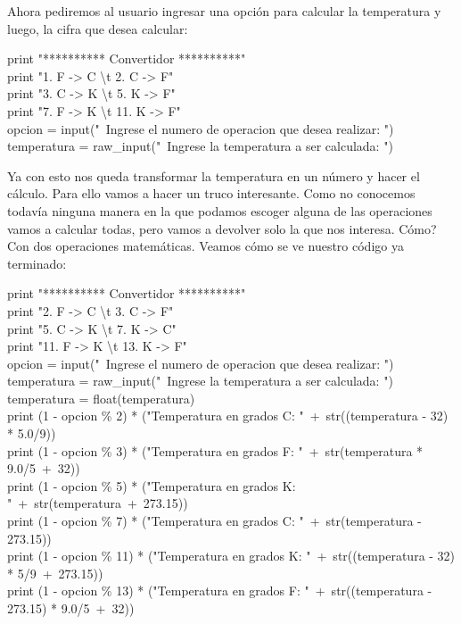 \documentclass[10pt,letterpaper]{article}
\newenvironment{Code}
{
\begin{lrbox}{\selvestebox}%
\begin{minipage}{\dimexpr\columnwidth-2\fboxsep\relax}
\fontfamily{\ttdefault}\selectfont
}
{\end{minipage}\end{lrbox}%
\begin{center}
\colorbox{light-gray}{\usebox{\selvestebox}}
\end{center}
}
\begin{document}
\noindent Ahora pediremos al usuario ingresar una opci\'on para calcular la temperatura y luego, la cifra que desea calcular:

\begin{Code}
print "********** Convertidor **********"\\
print "1. F -> C \textbackslash t  2. C -> F"\\
print "3. C -> K \textbackslash t  5. K -> F"\\
print "7. F -> K \textbackslash t 11. K -> F"\\
opcion = input("\ \hspace{-2mm}Ingrese el numero de operacion que desea realizar: ")\\
temperatura = raw\_input("\ \hspace{-2mm}Ingrese la temperatura a ser calculada: ")
\end{Code}

\noindent Ya con esto nos queda transformar la temperatura en un n\'umero y hacer el c\'alculo. Para ello vamos a hacer un truco interesante. Como no conocemos todav\'ia ninguna manera en la que podamos escoger alguna de las operaciones vamos a calcular todas, pero vamos a devolver solo la que nos interesa. C\'omo? Con dos operaciones matem\'aticas. Veamos c\'omo se ve nuestro c\'odigo ya terminado:

\begin{Code}
print "********** Convertidor **********"\\
print "2. F -> C \textbackslash t  3. C -> F"\\
print "5. C -> K \textbackslash t  7. K -> C"\\
print "11. F -> K \textbackslash t 13. K -> F"\\
opcion = input("\ \hspace{-2mm}Ingrese el numero de operacion que desea realizar: ")\\
temperatura = raw\_input("\ \hspace{-2mm}Ingrese la temperatura a ser calculada: ")\\
temperatura = float(temperatura)\\
print (1 - opcion \% 2) * ("Temperatura en grados C: "\ +\ str((temperatura - 32) * 5.0/9))\\
print (1 - opcion \% 3) * ("Temperatura en grados F: "\ +\ str(temperatura * 9.0/5\ +\ 32))\\
print (1 - opcion \% 5) * ("Temperatura en grados K: "\ +\ str(temperatura\ +\ 273.15))\\
print (1 - opcion \% 7) * ("Temperatura en grados C: "\ +\ str(temperatura - 273.15))\\
print (1 - opcion \% 11) * ("Temperatura en grados K: "\ +\ str((temperatura - 32) * 5/9\ +\ 273.15))\\
print (1 - opcion \% 13) * ("Temperatura en grados F: "\ +\ str((temperatura - 273.15) * 9.0/5\ +\ 32))
\end{Code}
\end{document}
